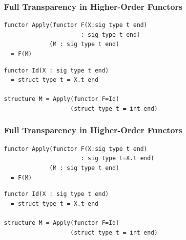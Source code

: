 \documentclass{beamer}
\begin{document}
\begin{frame}[fragile]
\frametitle{Full Transparency in Higher-Order Functors}

\begin{lstlisting}
functor Apply(functor F(X:sig type t end) 
                      : sig type t end) 
             (M : sig type t end)	
  = F(M)
\end{lstlisting}

\begin{lstlisting}
functor Id(X : sig type t end) 
  = struct type t = X.t end

structure M = Apply(functor F=Id)
                   (struct type t = int end)
\end{lstlisting}
\begin{block}{}
 
\end{block}
\end{frame}


\begin{frame}[fragile]
\frametitle{Full Transparency in Higher-Order Functors}
\begin{lstlisting}
functor Apply(functor F(X:sig type t end) 
                      : sig type t=X.t end) 
             (M : sig type t end)	
  = F(M)
\end{lstlisting}

\begin{lstlisting}
functor Id(X : sig type t end) 
  = struct type t = X.t end

structure M = Apply(functor F=Id)
                   (struct type t = int end)
\end{lstlisting}
\begin{block}{}
 	
\end{block}
\end{frame}
\end{document}
